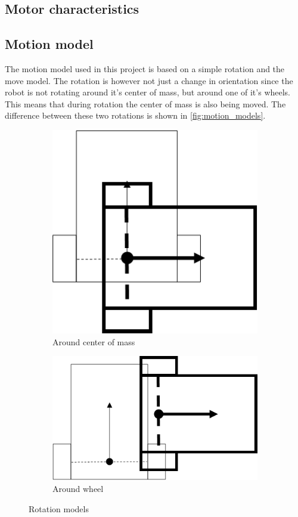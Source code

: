 \documentclass[Main]{subfiles}
\begin{document}

	\subsection{Motor characteristics} %
		\label{sub:motor_characteristics}
		

	\subsection{Motion model} %
		\label{sub:motion_model}
The motion model used in this project is based on a simple rotation and the move model.
The rotation is however not just a change in orientation since the robot is not rotating around it's center of mass, but around one of it's wheels.
This means that during rotation the center of mass is also being moved.
The difference between these two rotations is shown in \autoref{fig:motion_models}.
\begin{figure}[H]
	\centering
	\begin{subfigure}[b]{0.45\linewidth}
		\includegraphics[scale=0.8]{./Figures/motion_model1.png}
		\caption{Around center of mass}
		\label{fig:motion_model1}
	\end{subfigure}	
	\begin{subfigure}[b]{0.45\linewidth}
		\includegraphics[scale=0.8]{./Figures/motion_model2.png}
		\caption{Around wheel}
		\label{fig:motion_model2}
	\end{subfigure}
\caption{Rotation models}
\label{fig:motion_models}
\end{figure}
\end{document}
